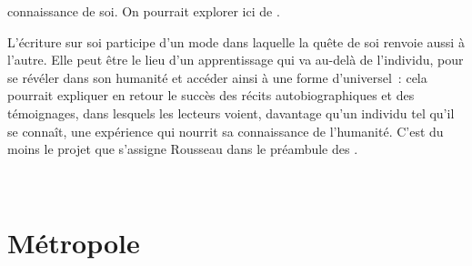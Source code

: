 {\begin{itemize}[label=\textbullet]
\begin{itemize}[label=$\circ$]
connaissance de soi. On pourrait explorer ici  de .
\end{itemize}
L'écriture sur soi participe d'un mode dans laquelle la quête de soi renvoie aussi à l'autre.
Elle peut être le lieu d'un apprentissage qui va au-delà de l'individu, pour se révéler dans
son humanité et accéder ainsi à une forme d'universel~: cela pourrait expliquer en retour
le succès des récits autobiographiques et des témoignages, dans lesquels les lecteurs
voient, davantage qu'un individu tel qu'il se connaît, une expérience qui nourrit sa
connaissance de l'humanité. C'est du moins le projet que s'assigne Rousseau dans le
préambule des .
\end{itemize}}

\vfill{~}\clearpage

\section{Métropole}

